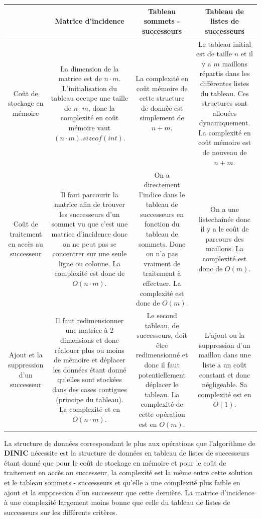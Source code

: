 \documentclass[11pt, a4paper]{report}
\begin{document}
    \begin{center}
        \begin{tabular}{ | c | c | c | c | } 
            \hline
            & Matrice d'incidence & Tableau sommets - successeurs & Tableau de listes de successeurs \\
            \hline
            Coût de stockage en mémoire & La dimension de la matrice est de $n·m$. L'initialisation du tableau occupe une taille de $n·m$, donc la complexité en coût mémoire vaut $(n·m).sizeof(int)$. & La complexité en coût mémoire de cette structure de donnée est simplement de $n+m$. & Le tableau initial est de taille $n$ et il y a $m$ maillons répartis dans les différentes listes du tableau. Ces structures sont allouées dynamiquement. La complexité en coût mémoire est de nouveau de $n+m$.\\
            \hline
            Coût de traitement en accès au successeur & Il faut parcourir la matrice afin de trouver les successeurs d'un sommet vu que c'est une matrice d'incidence donc on ne peut pas se concentrer sur une seule ligne ou colonne. La complexité est donc de $O(n·m)$. & On a directement l'indice dans le tableau de successeurs en fonction du tableau de sommets. Donc on n'a pas vraiment de traitement à effectuer. La complexité est donc de $O(m)$. & On a une listechaînée donc il y a le coût de parcours des maillons. La complexité est donc de $O(m)$.\\
            \hline
            Ajout et la suppression d'un successeur & Il faut redimensionner une matrice à 2 dimensions et donc réalouer plus ou moins de mémoire et déplacer les données étant donné qu'elles sont stockées dans des cases contigues (principe du tableau). La complexité et en $O(n·m)$. & Le second tableau, de successeurs, doit être redimensionné et donc il faut potentiellement déplacer le tableau. La complexité de cette opération est en $O(m)$. & L'ajout ou la suppression d'un maillon dans une liste a un coût constant et donc négligeable. Sa complexité est en $O(1)$.\\
            \hline
        \end{tabular}
    \end{center}
    La structure de données correspondant le plus aux opérations que l'algorithme de \textbf{DINIC} nécessite est la structure de données en tableau de listes de successeurs étant donné que pour le coût de stockage en mémoire et pour le coût de traitement en accès au successeur, la complexité est la même entre cette solution et le tableau sommets - successeurs et qu'elle a une complexité plus faible en ajout et la suppression d'un successeur que cette dernière. La matrice d'incidence à une complexité largement moins bonne que celle du tableau de listes de successeurs sur les différents critères.
    
\end{document}
